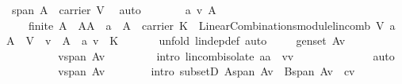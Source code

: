 \begin{isabellebody}
\ {}{\isacharcolon}\ {\isachardoublequoteopen}span\ A\ {\isacharequal}\ carrier\ V{\isachardoublequoteclose}\ \isamarkupfalse%
\ auto\isanewline
\ \ \isamarkupfalse%
\ {}\ {}\ \isamarkupfalse%
\ a\ v\ A{\isacharprime}\ \ \isanewline
\ \ \ \ {}{\isacharcolon}\ {\isachardoublequoteopen}finite\ A{\isacharprime}\ {\isasymand}\ A{\isacharprime}{\isasymsubseteq}A\ {\isasymand}\ a\ {\isasymin}\ A{\isacharprime}\ {\isasymrightarrow}\ carrier\ K\ {\isasymand}\ LinearCombinations{\isachardot}module{\isachardot}lincomb\ V\ a\ A{\isacharprime}\ {\isacharequal}\ {\isasymzero}\isactrlbsub V\isactrlesub \ {\isasymand}\ v\ {\isasymin}\ A{\isacharprime}\ {\isasymand}\ a\ v\ {\isasymnoteq}\ {\isasymzero}\isactrlbsub K\isactrlesub {\isachardoublequoteclose}\ \isanewline
\ \ \ \ \isamarkupfalse%
\ {\isacharparenleft}unfold\ lin{\isacharunderscore}dep{\isacharunderscore}def{\isacharcomma}\ auto{\isacharparenright}\isanewline
\ \ \isamarkupfalse%
\ {}{\isacharcolon}\ {\isachardoublequoteopen}gen{\isacharunderscore}set\ {\isacharparenleft}A{\isacharminus}{\isacharbraceleft}v{\isacharbraceright}{\isacharparenright}{\isachardoublequoteclose}\isanewline
\ \ \isamarkupfalse%
\ {\isacharminus}\ \isanewline
\ \ \ \ \isamarkupfalse%
\ {}\ {}\ \isamarkupfalse%
\ {}{\isacharcolon}\ {\isachardoublequoteopen}v{\isasymin}span\ {\isacharparenleft}A{\isacharprime}{\isacharminus}{\isacharbraceleft}v{\isacharbraceright}{\isacharparenright}{\isachardoublequoteclose}\ \isanewline
\ \ \ \ \ \ \isamarkupfalse%
\ {\isacharparenleft}intro\ lincomb{\isacharunderscore}isolate{\isacharbrackleft}\ a{\isacharequal}{\isachardoublequoteopen}a{\isachardoublequoteclose}\ \ v{\isacharequal}{\isachardoublequoteopen}v{\isachardoublequoteclose}{\isacharbrackright}{\isacharparenright}\ \isanewline
\ \ \ \ \ \ \ \ \ \ \ \isamarkupfalse%
\ auto\isanewline
\ \ \ \ \isamarkupfalse%
\ {}\ {}\ \isamarkupfalse%
\ {}{}{\isacharcolon}\ {\isachardoublequoteopen}v{\isasymin}span\ {\isacharparenleft}A{\isacharminus}{\isacharbraceleft}v{\isacharbraceright}{\isacharparenright}{\isachardoublequoteclose}\isanewline
\ \ \ \ \ \ \isamarkupfalse%
\ {\isacharparenleft}intro\ subsetD{\isacharbrackleft}\ {\isacharquery}A{\isacharequal}{\isachardoublequoteopen}span\ {\isacharparenleft}A{\isacharprime}{\isacharminus}{\isacharbraceleft}v{\isacharbraceright}{\isacharparenright}{\isachardoublequoteclose}\ \ {\isacharquery}B{\isacharequal}{\isachardoublequoteopen}span\ {\isacharparenleft}A{\isacharminus}{\isacharbraceleft}v{\isacharbraceright}{\isacharparenright}{\isachardoublequoteclose}\ \ {\isacharquery}c{\isacharequal}{\isachardoublequoteopen}v{\isachardoublequoteclose}{\isacharbrackright}{\isacharparenright}\isanewline

\end{isabellebody}
